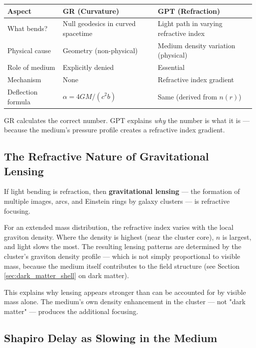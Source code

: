 \documentclass[12pt, a4paper]{article}
\begin{document}
\begin{center}
\begin{tabular}{|p{3.5cm}|p{5cm}|p{5cm}|}
\hline
\textbf{Aspect} & \textbf{GR (Curvature)} & \textbf{GPT (Refraction)} \\
\hline
What bends? & Null geodesics in curved spacetime & Light path in varying refractive index \\
\hline
Physical cause & Geometry (non-physical) & Medium density variation (physical) \\
\hline
Role of medium & Explicitly denied & Essential \\
\hline
Mechanism & None & Refractive index gradient \\
\hline
Deflection formula & \( \alpha = 4GM/(c^2 b) \) & Same (derived from \( n(r) \)) \\
\hline
\end{tabular}
\end{center}

GR calculates the correct number. GPT explains \textit{why} the number is what it is — because the medium's pressure profile creates a refractive index gradient.

\subsection{The Refractive Nature of Gravitational Lensing}
\label{subsec:refractive_lensing}

If light bending is refraction, then \textbf{gravitational lensing} — the formation of multiple images, arcs, and Einstein rings by galaxy clusters — is refractive focusing.

For an extended mass distribution, the refractive index varies with the local graviton density. Where the density is highest (near the cluster core), \( n \) is largest, and light slows the most. The resulting lensing patterns are determined by the cluster's graviton density profile — which is not simply proportional to visible mass, because the medium itself contributes to the field structure (see Section \ref{sec:dark_matter_shell} on dark matter).

This explains why lensing appears stronger than can be accounted for by visible mass alone. The medium's own density enhancement in the cluster — not "dark matter" — produces the additional focusing.

\subsection{Shapiro Delay as Slowing in the Medium}
\label{subsec:shapiro_delay}
\end{document}
